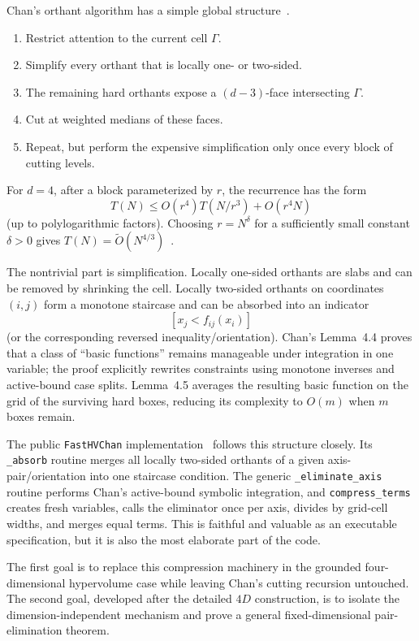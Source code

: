 \documentclass[12pt,a4paper]{article}
\theoremstyle{definition}
\newcommand{\1}{\mathbf 1}
\newcommand{\wtO}{\widetilde O}
\begin{document}
Chan's orthant algorithm has a simple global structure~\cite{Chan2013}.

\begin{enumerate}
\item Restrict attention to the current cell $\Gamma$.
\item Simplify every orthant that is locally one- or two-sided.
\item The remaining hard orthants expose a $(d-3)$-face intersecting $\Gamma$.
\item Cut at weighted medians of these faces.
\item Repeat, but perform the expensive simplification only once every block of cutting levels.
\end{enumerate}

For $d=4$, after a block parameterized by $r$, the recurrence has the form
\begin{equation}
T(N)\le O(r^4)T(N/r^3)+O(r^4N)                         \label{eq:chanrec}
\end{equation}
(up to polylogarithmic factors). Choosing $r=N^\delta$ for a sufficiently small constant $\delta>0$ gives $T(N)=\wtO(N^{4/3})$~\cite{Chan2013}.

The nontrivial part is simplification. Locally one-sided orthants are slabs and can be removed by shrinking the cell. Locally two-sided orthants on coordinates $(i,j)$ form a monotone staircase and can be absorbed into an indicator
\[
[x_j< f_{ij}(x_i)]
\]
(or the corresponding reversed inequality/orientation). Chan's Lemma~4.4 proves that a class of ``basic functions'' remains manageable under integration in one variable; the proof explicitly rewrites constraints using monotone inverses and active-bound case splits. Lemma~4.5 averages the resulting basic function on the grid of the surviving hard boxes, reducing its complexity to $O(m)$ when $m$ boxes remain.

The public \texttt{FastHVChan} implementation~\cite{FastHVChan} follows this structure closely. Its \texttt{\_absorb} routine merges all locally two-sided orthants of a given axis-pair/orientation into one staircase condition. The generic \texttt{\_eliminate\_axis} routine performs Chan's active-bound symbolic integration, and \texttt{compress\_terms} creates fresh variables, calls the eliminator once per axis, divides by grid-cell widths, and merges equal terms. This is faithful and valuable as an executable specification, but it is also the most elaborate part of the code.

The first goal is to replace this compression machinery in the grounded four-dimensional hypervolume case while leaving Chan's cutting recursion untouched.  The second goal, developed after the detailed $4D$ construction, is to isolate the dimension-independent mechanism and prove a general fixed-dimensional pair-elimination theorem.
\end{document}
